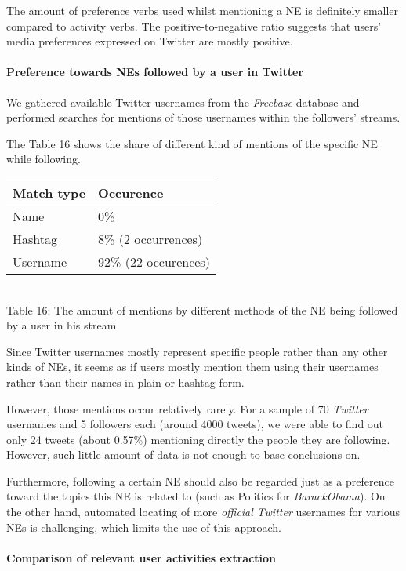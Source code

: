 The amount of preference verbs used whilst mentioning a NE is definitely
smaller compared to activity verbs. The positive-to-negative ratio suggests that users'
media preferences expressed on Twitter are mostly positive.

\paragraph{Preference towards NEs followed by a user in Twitter}
We gathered available Twitter usernames from the \textit{Freebase} database and performed searches
for mentions of those usernames within the followers' streams.

The Table 16 shows the share of different kind of mentions of the specific NE while following.

\begin{center}
  \begin{tabular}{ | p{3cm}| p{3.5cm} | } \hline
    Match type & Occurence \\ \hline
    Name & 0\% \\ \hline
    Hashtag & 8\% (2 occurrences) \\ \hline
    Username & 92\% (22 occurences) \\ \hline
  \end{tabular} \\
  Table 16: The amount of mentions by different methods of the NE being followed by a user in his stream \\
\end{center}

Since Twitter usernames mostly represent specific people rather than any other kinds of NEs, it seems as if users mostly
mention them using their usernames rather than their names in plain or hashtag form.

However, those mentions occur relatively rarely. For a sample of 70 \textit{Twitter} usernames and 5 followers each
(around 4000 tweets), we were able to find out only 24 tweets (about 0.57\%) mentioning directly the people they are
following. However, such little amount of data is not enough to base conclusions on.

Furthermore, following a certain NE should also be regarded just as a preference toward the topics this NE is related to
(such as Politics for \textit{BarackObama}). On the other hand, automated locating of more \textit{official}
\textit{Twitter} usernames for various NEs is challenging, which limits the use of this approach.

\paragraph{Comparison of relevant user activities extraction}

